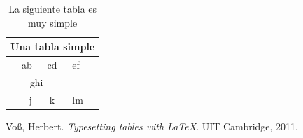 \documentclass[12pt,a4paper]{article}
\begin{document}
\begin{table}[H]
\centering
\caption{La siguiente tabla es muy simple}
\begin{tabular}{|r|c|l|}
\hline
\multicolumn{3}{|c|}{Una tabla simple} \\
\hline
ab & cd & ef \\
\cline{1-2}
\multicolumn{2}{|c|}{ghi} &  \\
\hline
j & k & lm \\
\hline
\end{tabular}
\end{table}

\begin{thebibliography}{99}
	 Vo\ss, Herbert. \emph{Typesetting tables with \LaTeX}. UIT Cambridge, 2011.
\end{thebibliography}
\end{document}
